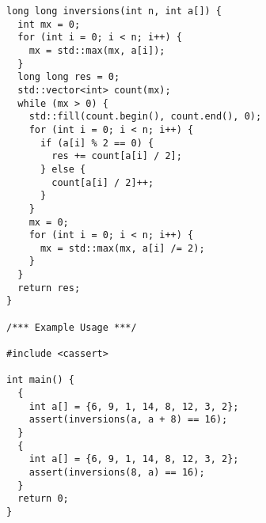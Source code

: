 \begin{lstlisting}
long long inversions(int n, int a[]) {
  int mx = 0;
  for (int i = 0; i < n; i++) {
    mx = std::max(mx, a[i]);
  }
  long long res = 0;
  std::vector<int> count(mx);
  while (mx > 0) {
    std::fill(count.begin(), count.end(), 0);
    for (int i = 0; i < n; i++) {
      if (a[i] % 2 == 0) {
        res += count[a[i] / 2];
      } else {
        count[a[i] / 2]++;
      }
    }
    mx = 0;
    for (int i = 0; i < n; i++) {
      mx = std::max(mx, a[i] /= 2);
    }
  }
  return res;
}

/*** Example Usage ***/

#include <cassert>

int main() {
  {
    int a[] = {6, 9, 1, 14, 8, 12, 3, 2};
    assert(inversions(a, a + 8) == 16);
  }
  {
    int a[] = {6, 9, 1, 14, 8, 12, 3, 2};
    assert(inversions(8, a) == 16);
  }
  return 0;
}
\end{lstlisting}
